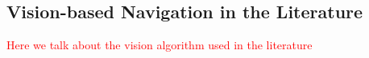 \subsection{Vision-based Navigation in the Literature}
\textcolor{red}{Here we talk about the vision algorithm used in the literature}
